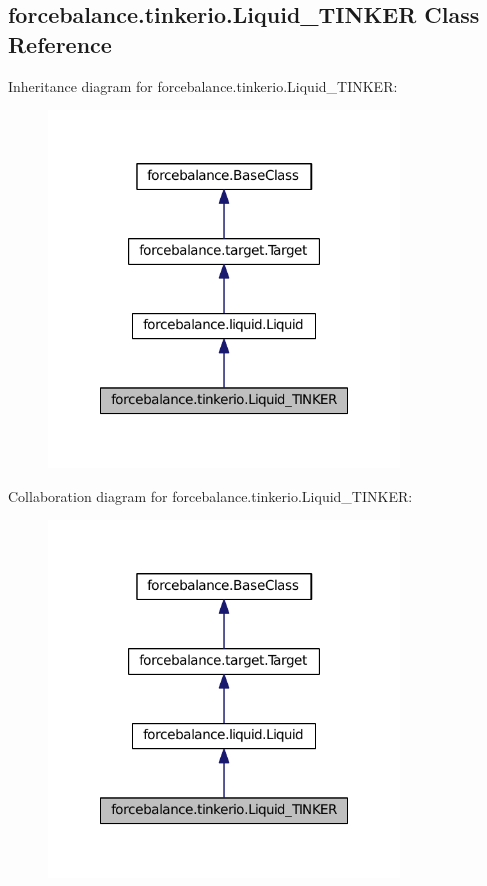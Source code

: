 \hypertarget{classforcebalance_1_1tinkerio_1_1Liquid__TINKER}{\subsection{forcebalance.\-tinkerio.\-Liquid\-\_\-\-T\-I\-N\-K\-E\-R \-Class \-Reference}
\label{classforcebalance_1_1tinkerio_1_1Liquid__TINKER}
}


\-Inheritance diagram for forcebalance.\-tinkerio.\-Liquid\-\_\-\-T\-I\-N\-K\-E\-R\-:\nopagebreak
\begin{figure}[H]
\begin{center}
\leavevmode
\includegraphics[width=264pt]{classforcebalance_1_1tinkerio_1_1Liquid__TINKER__inherit__graph}
\end{center}
\end{figure}


\-Collaboration diagram for forcebalance.\-tinkerio.\-Liquid\-\_\-\-T\-I\-N\-K\-E\-R\-:\nopagebreak
\begin{figure}[H]
\begin{center}
\leavevmode
\includegraphics[width=264pt]{classforcebalance_1_1tinkerio_1_1Liquid__TINKER__coll__graph}
\end{center}
\end{figure}
